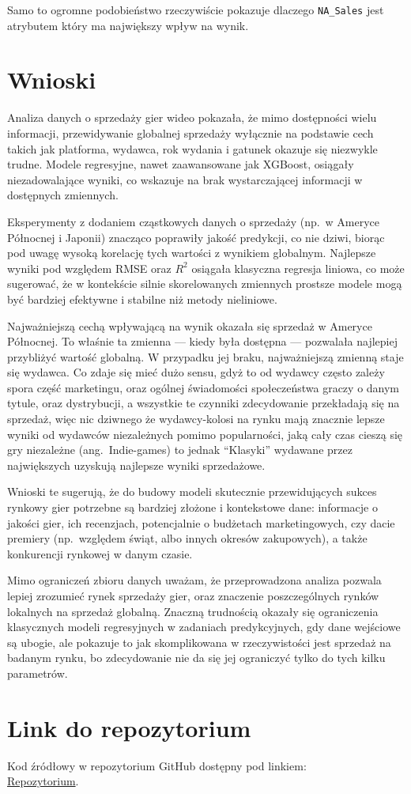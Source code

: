 \documentclass[11pt]{article}
\begin{document}
Samo to ogromne podobieństwo rzeczywiście pokazuje dlaczego \texttt{NA\_Sales} jest atrybutem który ma największy wpływ na wynik.


\section{Wnioski}\label{sec:wnioski}

Analiza danych o sprzedaży gier wideo pokazała, że mimo dostępności wielu informacji,
przewidywanie globalnej sprzedaży wyłącznie na podstawie cech takich jak platforma, wydawca, rok wydania i gatunek okazuje się niezwykle trudne.
Modele regresyjne, nawet zaawansowane jak XGBoost, osiągały niezadowalające wyniki,
co wskazuje na brak wystarczającej informacji w dostępnych zmiennych.

Eksperymenty z dodaniem cząstkowych danych o sprzedaży (np.~w Ameryce Północnej i Japonii) znacząco poprawiły jakość predykcji,
co nie dziwi, biorąc pod uwagę wysoką korelację tych wartości z wynikiem globalnym.
Najlepsze wyniki pod względem RMSE oraz \( R^2 \) osiągała klasyczna regresja liniowa, co może sugerować,
że w kontekście silnie skorelowanych zmiennych prostsze modele mogą być bardziej efektywne i stabilne niż metody nieliniowe.

Najważniejszą cechą wpływającą na wynik okazała się sprzedaż w Ameryce Północnej.
To właśnie ta zmienna — kiedy była dostępna — pozwalała najlepiej przybliżyć wartość globalną.
W przypadku jej braku, najważniejszą zmienną staje się wydawca.
Co zdaje się mieć dużo sensu, gdyż to od wydawcy często zależy spora część marketingu, oraz ogólnej świadomości społeczeństwa graczy o danym tytule, oraz dystrybucji,
a wszystkie te czynniki zdecydowanie przekładają się na sprzedaż, więc nic dziwnego że wydawcy-kolosi na rynku mają znacznie lepsze wyniki od wydawców niezależnych
pomimo popularności, jaką cały czas cieszą się gry niezależne (ang.~Indie-games) to jednak ``Klasyki'' wydawane przez największych uzyskują najlepsze wyniki sprzedażowe.

Wnioski te sugerują, że do budowy modeli skutecznie przewidujących sukces rynkowy gier potrzebne są bardziej złożone i kontekstowe dane:
informacje o jakości gier, ich recenzjach, potencjalnie o budżetach marketingowych, czy  dacie premiery
(np.~względem świąt, albo innych okresów zakupowych), a także konkurencji rynkowej w danym czasie.

Mimo ograniczeń zbioru danych uważam, że przeprowadzona analiza pozwala lepiej zrozumieć rynek sprzedaży gier, oraz
znaczenie poszczególnych rynków lokalnych na sprzedaż globalną.
Znaczną trudnością okazały się ograniczenia klasycznych modeli regresyjnych w zadaniach predykcyjnych,
gdy dane wejściowe są ubogie, ale pokazuje to jak skomplikowana w rzeczywistości jest sprzedaż na badanym rynku, bo zdecydowanie nie da się jej ograniczyć tylko do tych kilku parametrów.


\section{Link do repozytorium}\label{sec:link-do-repo}
Kod źródłowy w repozytorium GitHub dostępny pod linkiem: \\
\href{https://github.com/KotZPolibudy/PUT_SUS/tree/main/zdataset-analiza}{Repozytorium}.
\end{document}
